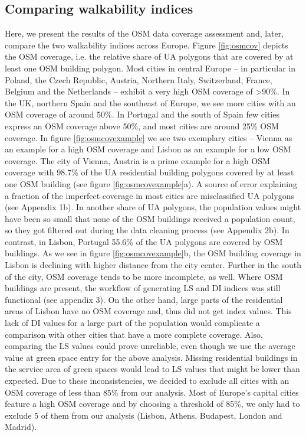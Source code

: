 \documentclass[10pt]{article}
\begin{document}
\subsection{Comparing walkability indices}
Here, we present the results of the OSM data coverage assessment and, later, compare the two walkability indices across Europe.
Figure \ref{fig:osmcov} depicts the OSM coverage, i.e. the relative share of UA polygons that are covered by at least one OSM building polygon. 
Most cities in central Europe – in particular in Poland, the Czech Republic, Austria, Northern Italy, Switzerland, France, Belgium and the Netherlands – exhibit a very high OSM coverage of \textgreater 90\%. 
In the UK, northern Spain and the southeast of Europe, we see more cities with an OSM coverage of around 50\%.
In Portugal and the south of Spain few cities express an OSM coverage above 50\%, and most cities are around 25\% OSM coverage.
In figure \ref{fig:osmcovexample} we see two exemplary cities – Vienna as an example for a high OSM coverage and Lisbon as an example for a low OSM coverage.
The city of Vienna, Austria is a prime example for a high OSM coverage with 98.7\% of the UA residential building polygons covered by at least one OSM building (see figure \ref{fig:osmcovexample}a).
A source of error explaining a fraction of the imperfect coverage in most cities are misclassified UA polygons (see Appendix 1b).
In another share of UA polygons, the population values might have been so small that none of the OSM buildings received a population count, so they got filtered out during the data cleaning process (see Appendix 2b).
In contrast, in Lisbon, Portugal 55.6\% of the UA polygons are covered by OSM buildings. 
As we see in figure \ref{fig:osmcovexample}b, the OSM building coverage in Lisbon is declining with higher distance from the city center.
Further in the south of the city, OSM coverage tends to be more incomplete, as well.
Where OSM buildings are present, the workflow of generating LS and DI indices was still functional (see appendix 3).
On the other hand, large parts of the residential areas of Lisbon have no OSM coverage and, thus did not get index values.
This lack of DI values for a large part of the population would complicate a comparison with other cities that have a more complete coverage.
Also, comparing the LS values could prove unreliable, even though we use the average value at green space entry for the above analysis.
Missing residential buildings in the service area of green spaces would lead to LS values that might be lower than expected.
Due to these inconsistencies, we decided to exclude all cities with an OSM coverage of less than 85\% from our analysis.
Most of Europe’s capital cities feature a high OSM coverage and by choosing a threshold of 85\%, we only had to exclude 5 of them from our analysis (Lisbon, Athens, Budapest, London and Madrid).  
\end{document}
